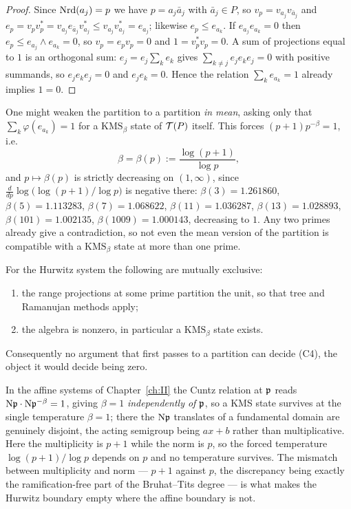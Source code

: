 \begin{proof}
Since $\operatorname{Nrd}(a_j)=p$ we have $p=a_j\bar a_j$ with $\bar a_j\in P$, so
$v_p=v_{a_j}v_{\bar a_j}$ and $e_p=v_pv_p^*=v_{a_j}e_{\bar a_j}v_{a_j}^*\le v_{a_j}v_{a_j}^*=e_{a_j}$;
likewise $e_p\le e_{a_k}$. If $e_{a_j}e_{a_k}=0$ then $e_p\le e_{a_j}\wedge e_{a_k}=0$, so
$v_p=e_pv_p=0$ and $1=v_p^*v_p=0$. A sum of projections equal to $1$ is an orthogonal sum:
$e_j=e_j\sum_ke_k$ gives $\sum_{k\ne j}e_je_ke_j=0$ with positive summands, so
$e_je_ke_j=0$ and $e_je_k=0$. Hence the relation $\sum_ke_{a_k}=1$ already implies $1=0$.
\end{proof}

\begin{remark}\label{XI:rem:betavals}
One might weaken the partition to a partition \emph{in mean}, asking only that
$\sum_k\varphi(e_{a_k})=1$ for a $\mathrm{KMS}_\beta$ state of $\mathcal{T}(P)$ itself. This forces
$(p+1)p^{-\beta}=1$, i.e.
\[
\beta=\beta(p):=\frac{\log(p+1)}{\log p},
\]
and $p\mapsto\beta(p)$ is strictly decreasing on $(1,\infty)$, since
$\frac{d}{dp}\log\bigl(\log(p+1)/\log p\bigr)$ is negative there: $\beta(3)=1.261860$,
$\beta(5)=1.113283$, $\beta(7)=1.068622$, $\beta(11)=1.036287$, $\beta(13)=1.028893$,
$\beta(101)=1.002135$, $\beta(1009)=1.000143$, decreasing to $1$. Any two primes already
give a contradiction, so not even the mean version of the partition is compatible with a
$\mathrm{KMS}_\beta$ state at more than one prime.
\end{remark}

\begin{corollary}\label{XI:cor:dichotomy}
For the Hurwitz system the following are mutually exclusive:
\begin{enumerate}
\item the range projections at some prime partition the unit, so that tree and
Ramanujan methods apply;
\item the algebra is nonzero, in particular a $\mathrm{KMS}_\beta$ state exists.
\end{enumerate}
Consequently no argument that first passes to a partition can decide (C4), the object it
would decide being zero.
\end{corollary}

\begin{remark}\label{XI:rem:contrast}
In the affine systems of Chapter~\ref{ch:II} the Cuntz relation at $\mathfrak{p}$ reads
$\mathrm{N}\mathfrak{p}\cdot\mathrm{N}\mathfrak{p}^{-\beta}=1$, giving $\beta=1$ \emph{independently of $\mathfrak{p}$}, so a KMS state
survives at the single temperature $\beta=1$; there the $\mathrm{N}\mathfrak{p}$ translates of a fundamental
domain are genuinely disjoint, the acting semigroup being $ax+b$ rather than
multiplicative. Here the multiplicity is $p+1$ while the norm
is $p$, so the forced temperature $\log(p+1)/\log p$ depends on $p$ and no temperature
survives. The mismatch between multiplicity and norm --- $p+1$ against $p$, the discrepancy
being exactly the ramification-free part of the Bruhat--Tits degree --- is what makes the
Hurwitz boundary empty where the affine boundary is not.
\end{remark}

